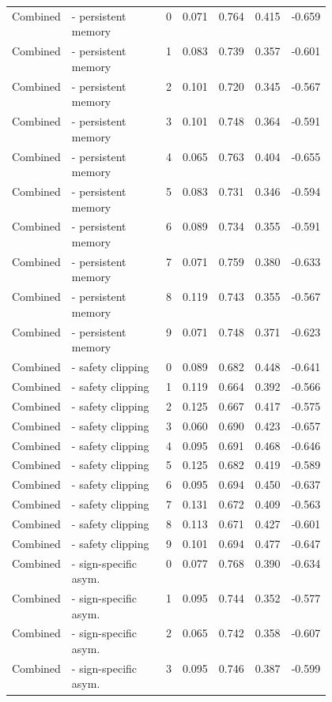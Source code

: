 \documentclass{article}
\begin{document}
\begin{center}
\begin{longtable}{p{0.13\linewidth}p{0.34\linewidth}rrrrr}
Combined & - persistent memory & 0 & 0.071 & 0.764 & 0.415 & -0.659\\
Combined & - persistent memory & 1 & 0.083 & 0.739 & 0.357 & -0.601\\
Combined & - persistent memory & 2 & 0.101 & 0.720 & 0.345 & -0.567\\
Combined & - persistent memory & 3 & 0.101 & 0.748 & 0.364 & -0.591\\
Combined & - persistent memory & 4 & 0.065 & 0.763 & 0.404 & -0.655\\
Combined & - persistent memory & 5 & 0.083 & 0.731 & 0.346 & -0.594\\
Combined & - persistent memory & 6 & 0.089 & 0.734 & 0.355 & -0.591\\
Combined & - persistent memory & 7 & 0.071 & 0.759 & 0.380 & -0.633\\
Combined & - persistent memory & 8 & 0.119 & 0.743 & 0.355 & -0.567\\
Combined & - persistent memory & 9 & 0.071 & 0.748 & 0.371 & -0.623\\
Combined & - safety clipping & 0 & 0.089 & 0.682 & 0.448 & -0.641\\
Combined & - safety clipping & 1 & 0.119 & 0.664 & 0.392 & -0.566\\
Combined & - safety clipping & 2 & 0.125 & 0.667 & 0.417 & -0.575\\
Combined & - safety clipping & 3 & 0.060 & 0.690 & 0.423 & -0.657\\
Combined & - safety clipping & 4 & 0.095 & 0.691 & 0.468 & -0.646\\
Combined & - safety clipping & 5 & 0.125 & 0.682 & 0.419 & -0.589\\
Combined & - safety clipping & 6 & 0.095 & 0.694 & 0.450 & -0.637\\
Combined & - safety clipping & 7 & 0.131 & 0.672 & 0.409 & -0.563\\
Combined & - safety clipping & 8 & 0.113 & 0.671 & 0.427 & -0.601\\
Combined & - safety clipping & 9 & 0.101 & 0.694 & 0.477 & -0.647\\
Combined & - sign-specific asym. & 0 & 0.077 & 0.768 & 0.390 & -0.634\\
Combined & - sign-specific asym. & 1 & 0.095 & 0.744 & 0.352 & -0.577\\
Combined & - sign-specific asym. & 2 & 0.065 & 0.742 & 0.358 & -0.607\\
Combined & - sign-specific asym. & 3 & 0.095 & 0.746 & 0.387 & -0.599\\

\end{longtable}
\end{center}
\end{document}
